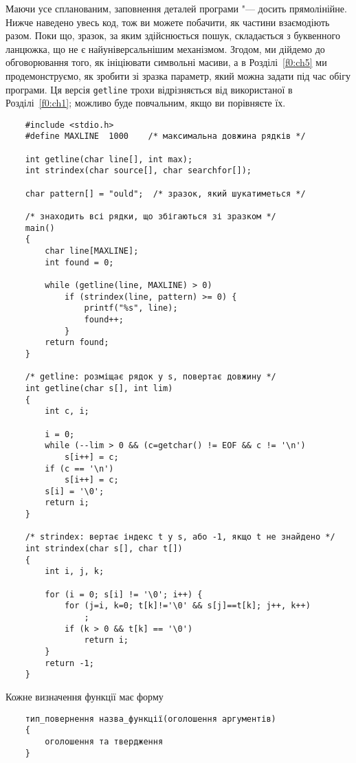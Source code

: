 \documentclass[a4paper,12pt]{book}
\begin{document}
  Маючи усе спланованим, заповнення деталей програми "--- досить прямолінійне. Нижче
  наведено увесь код, тож ви можете побачити, як частини взаємодіють разом. Поки що,
  зразок, за яким здійснюється пошук, складається з буквенного ланцюжка, що не є
  найуніверсальнішим механізмом. Згодом, ми дійдемо до обговорювання того, як ініціювати
  символьні масиви, а в Розділі~\ref{f0:ch5} ми продемонструємо, як зробити зі
  зразка параметр, який можна задати під час обігу програми. Ця версія \texttt{getline}
  трохи відрізняється від використаної в Розділі~\ref{f0:ch1}; можливо буде
  повчальним, якщо ви порівняєте їх.
  \begin{verbatim}
    #include <stdio.h>
    #define MAXLINE  1000    /* максимальна довжина рядків */

    int getline(char line[], int max);
    int strindex(char source[], char searchfor[]);

    char pattern[] = "ould";  /* зразок, який шукатиметься */

    /* знаходить всі рядки, що збігаються зі зразком */
    main()
    {
        char line[MAXLINE];
        int found = 0;

        while (getline(line, MAXLINE) > 0)
            if (strindex(line, pattern) >= 0) {
                printf("%s", line);
                found++;
            }
        return found;
    }

    /* getline: розміщає рядок у s, повертає довжину */
    int getline(char s[], int lim)
    {
        int c, i;

        i = 0;
        while (--lim > 0 && (c=getchar() != EOF && c != '\n')
            s[i++] = c;
        if (c == '\n')
            s[i++] = c;
        s[i] = '\0';
        return i;
    }

    /* strindex: вертає індекс t у s, або -1, якщо t не знайдено */
    int strindex(char s[], char t[])
    {
        int i, j, k;

        for (i = 0; s[i] != '\0'; i++) {
            for (j=i, k=0; t[k]!='\0' && s[j]==t[k]; j++, k++)
                ;
            if (k > 0 && t[k] == '\0')
                return i;
        }
        return -1;
    }
  \end{verbatim}

  Кожне визначення функції має форму
  \begin{verbatim}
    тип_повернення назва_функції(оголошення аргументів)
    {
        оголошення та твердження
    }
  \end{verbatim}
\end{document}
